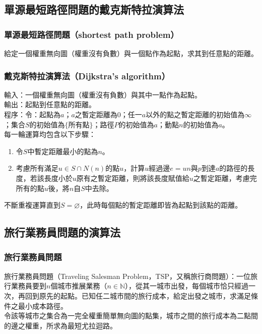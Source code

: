 \documentclass[a4paper,12pt]{report}
\begin{document}
\subsection{單源最短路徑問題的戴克斯特拉演算法}
\subsubsection{單源最短路徑問題（shortest path problem）}
給定一個權重無向圖（權重沒有負數）與一個點作為起點，求其到任意點的距離。
\subsubsection{戴克斯特拉演算法（Dijkstra's algorithm）}
輸入：一個權重無向圖（權重沒有負數）與其中一點作為起點。 \\
輸出：起點到任意點的距離。 \\
程序：令：起點為$a$；$a$之暫定距離為$0$；任一$a$以外的點之暫定距離的初始值為$\infty$；集合$S$的初始值為$\{$所有點$\}$；路徑$P$的初始值為$a$；動點$n$的初始值為$a$。 \\
每一輪運算均包含以下步驟：
\begin{enumerate}[label=(\arabic*)]
\item 令$S$中暫定距離最小的點為$n$。
\item 考慮所有滿足$u\in S\cap N(n)$的點$u$，計算$u$經過邊$e=un$與$p$到達$a$的路徑的長度，若該長度小於$u$原有之暫定距離，則將該長度賦值給$u$之暫定距離，考慮完所有的點$u$後，將$n$自$S$中去除。
\end{enumerate}
不斷重複運算直到$S=\varnothing$，此時每個點的暫定距離即皆為起點到該點的距離。
\subsection{旅行業務員問題的演算法}
\subsubsection{旅行業務員問題}
旅行業務員問題（Traveling Salesman Problem，TSP，又稱旅行商問題）：一位旅行業務員要到$n$個城市推展業務（$n \in \mathbb{N}$），從其一城市出發，每個城市恰只經過一次，再回到原先的起點。已知任二城市間的旅行成本，給定出發之城市，求滿足條件之最小成本路徑。 \\
令該等城市之集合為一完全權重簡單無向圖的點集，城市之間的旅行成本為二點間的邊之權重，所求為最短尤拉迴路。
\end{document}
